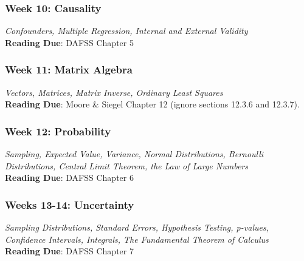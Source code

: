 \documentclass[11pt, letterpaper]{article}
\begin{document}

\subsubsection*{Week 10: Causality}
\textit{Confounders, Multiple Regression, Internal and External Validity}\\
\textbf{Reading Due}: DAFSS Chapter 5

\subsubsection*{Week 11: Matrix Algebra}
\textit{Vectors, Matrices, Matrix Inverse, Ordinary Least Squares}\\
\textbf{Reading Due}: Moore \& Siegel Chapter 12 (ignore sections 12.3.6 and 12.3.7).



\subsubsection*{Week 12: Probability}
\textit{Sampling, Expected Value, Variance, Normal Distributions, Bernoulli Distributions, Central Limit Theorem, the Law of Large Numbers}\\
\textbf{Reading Due}: DAFSS Chapter 6

\subsubsection*{Weeks 13-14: Uncertainty}
\textit{Sampling Distributions, Standard Errors, Hypothesis Testing, p-values, Confidence Intervals, Integrals, The Fundamental Theorem of Calculus}\\
\textbf{Reading Due}: DAFSS Chapter 7


%
\end{document}
